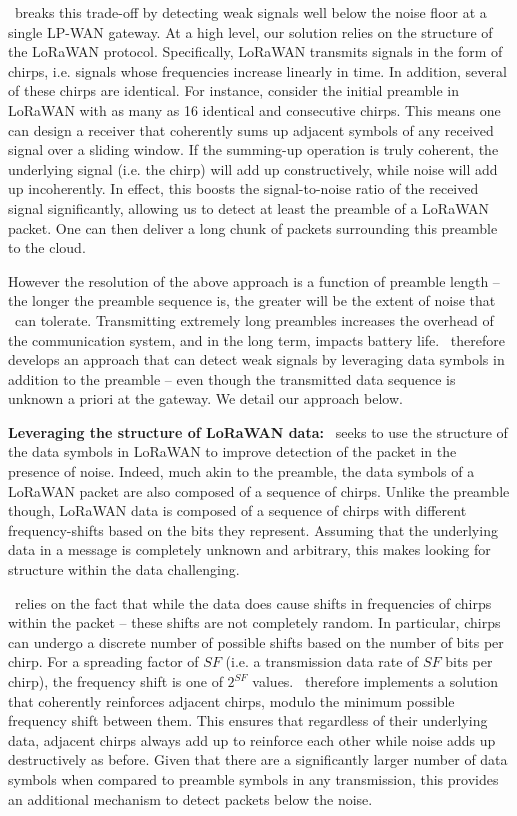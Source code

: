 \name\ breaks this trade-off by detecting weak signals well below the noise floor at a single LP-WAN gateway. At a high level, our solution relies on the structure of the LoRaWAN protocol. Specifically, LoRaWAN transmits signals in the form of chirps, i.e. signals whose frequencies increase linearly in time. In addition, several of these chirps are identical. For instance, consider the initial preamble  in LoRaWAN with as many as 16 identical and consecutive chirps. This means one can design a receiver that coherently sums up adjacent symbols of any received signal over a sliding window. If the summing-up operation is truly coherent, the underlying signal (i.e. the chirp) will add up constructively, while noise will add up incoherently. In effect, this boosts the signal-to-noise ratio of the received signal significantly, allowing us to detect at least the preamble of a LoRaWAN packet. One can then deliver a long chunk of packets surrounding this preamble to the cloud. 

However the resolution of the above approach is a function of preamble length -- the longer the preamble sequence is, the greater will be the extent of noise that \name\ can tolerate. Transmitting extremely long preambles increases the overhead of the communication system, and in the long term, impacts battery life. \name\ therefore develops an approach that can detect weak signals by leveraging data symbols in addition to the preamble -- even though the transmitted data sequence is unknown a priori at the gateway. We detail our approach below. \vspace*{0.1in}

\noindent \textbf{Leveraging the structure of LoRaWAN data: } \name\ seeks to use the structure of the data symbols in LoRaWAN to improve detection of the packet in the presence of noise. Indeed, much akin to the preamble, the data symbols of a LoRaWAN packet are also composed of a sequence of chirps. Unlike the preamble though, LoRaWAN data is composed of a sequence of chirps with different frequency-shifts based on the bits they represent. Assuming that the underlying data in a message is completely unknown and arbitrary, this makes looking for structure within the data challenging. 

\name\ relies on the fact that while the data does cause shifts in frequencies of chirps within the packet -- these shifts are not completely random. In particular, chirps can undergo a discrete number of possible shifts based on the number of bits per chirp. For a spreading factor of $SF$ (i.e. a transmission data rate of $SF$ bits per chirp), the frequency shift is one of $2^{SF}$ values. \name\ therefore implements a solution that coherently reinforces adjacent chirps, modulo the minimum possible frequency shift between them. This ensures that regardless of their underlying data, adjacent chirps always add up to reinforce each other while noise adds up destructively as before. Given that there are a significantly larger number of data symbols when compared to preamble symbols in any transmission, this provides an additional mechanism to detect packets below the noise. 

